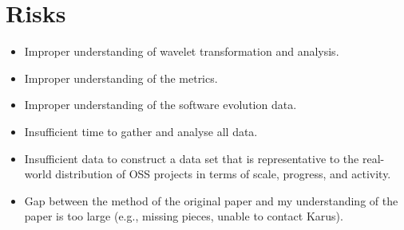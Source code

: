 \section{Risks}
\begin{itemize}
	\item Improper understanding of wavelet transformation and analysis.
	\item Improper understanding of the metrics.
	\item Improper understanding of the software evolution data.
	\item Insufficient time to gather and analyse all data.
	\item Insufficient data to construct a data set that is representative to the
	real-world distribution of OSS projects in terms of scale, progress, and
	activity.
	\item Gap between the method of the original paper and my understanding of the
	paper is too large (e.g., missing pieces, unable to contact Karus).
\end{itemize}
